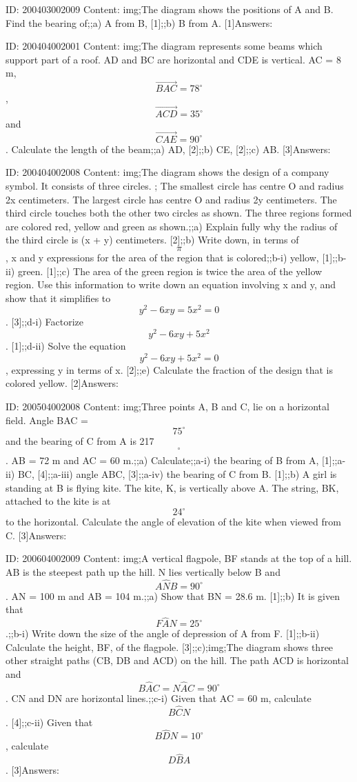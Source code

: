 \documentclass{article}
\begin{document}
ID: 200403002009
Content:
img;The diagram shows the positions of A and B. Find the bearing of;;a) A from B, [1];;b) B from A. [1]Answers:

ID: 200404002001
Content:
img;The diagram represents some beams which support part of a roof. AD and BC are horizontal and CDE is vertical. AC = 8 m, $$\vec{BAC}=78^{\circ}$$, $$\vec{ACD}=35^{\circ}$$ and  $$\vec{CAE}=90^{\circ}$$. Calculate the length of the beam;;a) AD, [2];;b) CE, [2];;c) AB. [3]Answers:

ID: 200404002008
Content:
img;The diagram shows the design of a company symbol. It consists of three circles. ; The smallest circle has centre O and radius 2x centimeters. The largest circle has centre O and radius 2y centimeters. The third circle touches both the other two circles as shown. The three regions formed are colored red, yellow and green as shown.;;a) Explain fully why the radius of the third circle is (x + y) centimeters. [2];;b) Write down, in terms of $$\pi$$, x and y expressions for the area of the region that is colored;;b-i) yellow, [1];;b-ii) green. [1];;c) The area of the green region is twice the area of the yellow region. Use this information to write down an equation involving x and y, and show that it simplifies to $$y^{2} -6xy=5x^{2} =0$$. [3];;d-i) Factorize $$y^{2} -6xy+5x^{2} $$. [1];;d-ii) Solve the equation $$y^{2} -6xy+5x^{2}=0$$, expressing y in terms of x. [2];;e) Calculate the fraction of the design that is colored yellow. [2]Answers:

ID: 200504002008
Content:
img;Three points A, B and C, lie on a horizontal field. Angle BAC = $$75^{\circ}$$ and the bearing of C from A is 217$$^{\circ}$$. AB = 72 m and AC = 60 m.;;a) Calculate;;a-i) the bearing of B from A, [1];;a-ii) BC, [4];;a-iii) angle ABC, [3];;a-iv) the bearing of C from B. [1];;b) A girl is standing at B is flying kite. The kite, K, is vertically above A. The string, BK, attached to the kite is at $$24^{\circ}$$ to the horizontal. Calculate the angle of elevation of the kite when viewed from C. [3]Answers:

ID: 200604002009
Content:
img;A vertical flagpole, BF stands at the top of a hill. AB is the steepest path up the hill. N lies vertically below B and $$A \hat NB=90^{\circ}$$. AN = 100 m and AB = 104 m.;;a) Show that BN = 28.6 m. [1];;b) It is given that $$F \hat AN=25^{\circ}$$.;;b-i) Write down the size of the angle of depression of A from F. [1];;b-ii) Calculate the height, BF, of the flagpole. [3];;c);img;The diagram shows three other straight paths (CB, DB and ACD) on the hill. The path ACD is horizontal and $$B \hat AC=N \hat AC=90^{\circ}$$. CN and DN are horizontal lines.;;c-i) Given that AC = 60 m, calculate $$B \hat CN$$. [4];;c-ii) Given that $$B \hat DN=10^{\circ}$$, calculate $$D \hat BA$$. [3]Answers:
\end{document}
